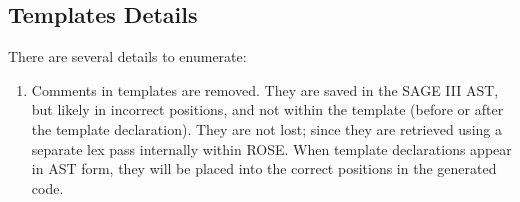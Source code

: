 \subsection{ Templates Details }
   There are several details to enumerate:
\begin{enumerate}
     \item Comments in templates are removed. They are saved in the SAGE III AST, but
           likely in incorrect positions, and not within the template 
           (before or after the template declaration).  They are not lost; since they
           are retrieved using a separate lex pass internally within ROSE.  
           When template declarations appear in AST form, they will be placed into the
           correct positions in the generated code.


\end{enumerate}
